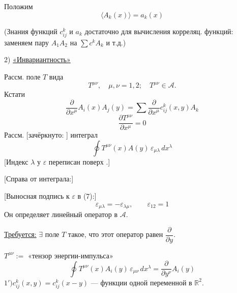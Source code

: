Положим
\begin{equation*}
\langle A_k(x)\rangle=a_k(x)
\end{equation*}


(Знания функций $c_{ij}^k$ и $a_k$ достаточно для вычисления корреляц.
функций: заменяем пару $A_1A_2$ на $\sum c^kA_k$ и т.д.)

2) \underline{«Инвариантность»}

Рассм. поле $T$ вида
\begin{equation*}
T^{\mu\nu},\quad\mu,\nu=1,2;\quad T^{\mu\nu}\in\mathcal A.
\end{equation*}
Кстати
\begin{equation*}
\frac{\partial}{\partial x^\mu}A_i(x)A_j(y)
=\sum\frac{\partial}{\partial x^\mu}c_{ij}^k(x,y)A_k
\tag{5}
\end{equation*}
\begin{equation*}
\frac{\partial T^{\mu\nu}}{\partial x^\mu}=0
\tag{6}
\end{equation*}
Рассм. [зачёркнуто: ] интеграл
\begin{equation*}
\oint T^{\mu\nu}(x)A(y)\,\varepsilon_{\mu\lambda}\,dx^\lambda
\tag{7}
\end{equation*}
[Индекс $\lambda$ у $\varepsilon$ переписан поверх
.]

[Справа от интеграла:]
\begin{center}
\end{center}
[Выносная подпись к $\varepsilon$ в (7):]
\begin{equation*}
\varepsilon_{\mu\lambda}=-\varepsilon_{\lambda\mu},\qquad\varepsilon_{12}=1
\end{equation*}
Он определяет линейный оператор в $\mathcal A$.

\underline{Требуется:} $\exists$ поле $T$ такое, что этот оператор равен $\dfrac{\partial}{\partial y}$.

$T^{\mu\nu}:=$ «тензор энергии-импульса»
\begin{equation*}
\oint T^{\mu\nu}(x)A_i(y)\,
\varepsilon_{\mu\nu}
\,dx^\lambda
=\frac{\partial}{\partial y^\nu}A_i(y)
\end{equation*}
$1')$\quad $c_{ij}^k(x,y)=c_{ij}^k(x-y)$ — функции одной переменной в $\mathbb R^2$.


